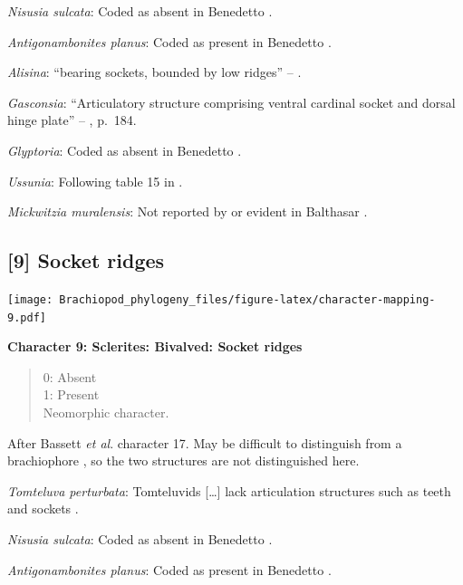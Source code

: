 \documentclass[openany]{book}
\theoremstyle{definition}
\theoremstyle{definition}
\theoremstyle{definition}
\theoremstyle{remark}
\begin{document}
\emph{Nisusia sulcata}: Coded as absent in Benedetto
\citeyearpar{Benedetto2009iChaniella}.

\emph{Antigonambonites planus}: Coded as present in Benedetto
\citeyearpar{Benedetto2009iChaniella}.

\emph{Alisina}: ``bearing sockets, bounded by low ridges'' --
\citet{Williams2000BrachiopodaLinguliformea}.

\emph{Gasconsia}: ``Articulatory structure comprising ventral cardinal
socket and dorsal hinge plate'' --
\citet{Williams2000BrachiopodaLinguliformea}, p.~184.

\emph{Glyptoria}: Coded as absent in Benedetto
\citeyearpar{Benedetto2009iChaniella}.

\emph{Ussunia}: Following table 15 in
\citet{Williams2000BrachiopodaLinguliformea}.

\emph{Mickwitzia muralensis}: Not reported by or evident in Balthasar
\citeyearpar{Balthasar2004Shellstructure}.

\hypertarget{socket-ridges}{%
\subsection*{{[}9{]} Socket ridges}\label{socket-ridges}}

\texttt{[image: Brachiopod\_phylogeny\_files/figure-latex/character-mapping-9.pdf]}

\textbf{Character 9: Sclerites: Bivalved: Socket ridges}

\begin{quote}
0: Absent\\
1: Present\\
Neomorphic character.
\end{quote}

After Bassett \emph{et al}.
\citeyearpar{Bassett2001Functionalmorphology} character 17. May be
difficult to distinguish from a brachiophore \citep[see Fig 323
in][]{Williams1997BrachiopodaRevised}, so the two structures are not
distinguished here.

\emph{Tomteluva perturbata}: Tomteluvids {[}\ldots{}{]} lack
articulation structures such as teeth and sockets
\citep{Streng2016Anew}.

\emph{Nisusia sulcata}: Coded as absent in Benedetto
\citeyearpar{Benedetto2009iChaniella}.

\emph{Antigonambonites planus}: Coded as present in Benedetto
\citeyearpar{Benedetto2009iChaniella}.
\end{document}
